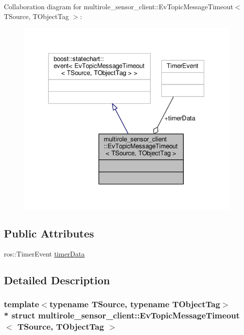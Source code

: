 Collaboration diagram for multirole\+\_\+sensor\+\_\+client\+:\+:Ev\+Topic\+Message\+Timeout$<$ T\+Source, T\+Object\+Tag $>$\+:\nopagebreak
\begin{figure}[H]
\begin{center}
\leavevmode
\includegraphics[width=326pt]{structmultirole__sensor__client_1_1EvTopicMessageTimeout__coll__graph}
\end{center}
\end{figure}
\subsection*{Public Attributes}
\begin{DoxyCompactItemize}
\item 
ros\+::\+Timer\+Event \hyperlink{structmultirole__sensor__client_1_1EvTopicMessageTimeout_acf6851104497bd60ac389051f5b4f2b0}{timer\+Data}
\end{DoxyCompactItemize}


\subsection{Detailed Description}
\subsubsection*{template$<$typename T\+Source, typename T\+Object\+Tag$>$\\*
struct multirole\+\_\+sensor\+\_\+client\+::\+Ev\+Topic\+Message\+Timeout$<$ T\+Source, T\+Object\+Tag $>$}



